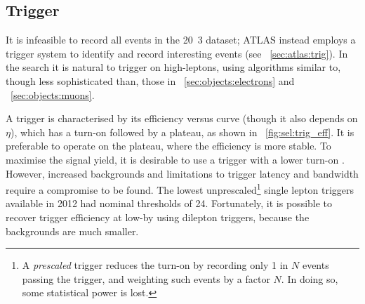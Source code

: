 \subsection{Trigger}
\label{sec:selection:trigger}

It is infeasible to record all events in the \unit{20.3}{\invfb} dataset; ATLAS instead 
employs a trigger system to identify and record interesting events (see 
\Section~\ref{sec:atlas:trig}). In the \HWWlvlv search it is natural to trigger on 
high-\pt leptons, using algorithms similar to, though less sophisticated than, those in 
\Section~\ref{sec:objects:electrons} and \Section~\ref{sec:objects:muons}.

A trigger is characterised by its efficiency versus \pt curve (though it also depends on 
$\eta$), which has a turn-on followed by a plateau, as shown in 
\Figure~\ref{fig:sel:trig_eff}. It is preferable to operate on the plateau, where the 
efficiency is more stable. To maximise the signal yield, it is desirable to use a trigger 
with a lower turn-on \pt. However, increased backgrounds and limitations to trigger 
latency and bandwidth require a compromise to be found. The lowest unprescaled\footnote{
	A \textit{prescaled} trigger reduces the turn-on \pt by recording only 1 in $N$ 
	events passing the trigger, and weighting such events by a factor $N$. In doing so, 
	some statistical power is lost.
}
single lepton triggers available in 2012 had nominal \pt thresholds of \unit{24}{\GeV}. 
Fortunately, it is possible to recover trigger efficiency at low-\pt by using dilepton 
triggers, because the backgrounds are much smaller.

